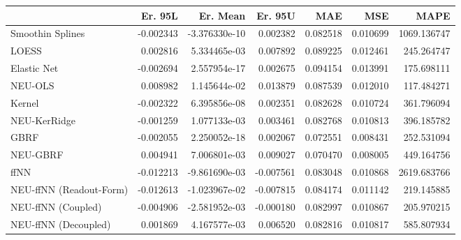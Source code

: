 \begin{tabular}{lrrrrrr}
\toprule
{} &   Er. 95L &      Er. Mean &   Er. 95U &       MAE &       MSE &         MAPE \\
\midrule
Smoothin Splines        & -0.002343 & -3.376330e-10 &  0.002382 &  0.082518 &  0.010699 &  1069.136747 \\
LOESS                   &  0.002816 &  5.334465e-03 &  0.007892 &  0.089225 &  0.012461 &   245.264747 \\
Elastic Net             & -0.002694 &  2.557954e-17 &  0.002675 &  0.094154 &  0.013991 &   175.698111 \\
NEU-OLS                 &  0.008982 &  1.145644e-02 &  0.013879 &  0.087539 &  0.012010 &   117.484271 \\
Kernel                  & -0.002322 &  6.395856e-08 &  0.002351 &  0.082628 &  0.010724 &   361.796094 \\
NEU-KerRidge            & -0.001259 &  1.077133e-03 &  0.003461 &  0.082768 &  0.010813 &   396.185782 \\
GBRF                    & -0.002055 &  2.250052e-18 &  0.002067 &  0.072551 &  0.008431 &   252.531094 \\
NEU-GBRF                &  0.004941 &  7.006801e-03 &  0.009027 &  0.070470 &  0.008005 &   449.164756 \\
ffNN                    & -0.012213 & -9.861690e-03 & -0.007561 &  0.083048 &  0.010868 &  2619.683766 \\
NEU-ffNN (Readout-Form) & -0.012613 & -1.023967e-02 & -0.007815 &  0.084174 &  0.011142 &   219.145885 \\
NEU-ffNN (Coupled)      & -0.004906 & -2.581952e-03 & -0.000180 &  0.082997 &  0.010867 &   205.970215 \\
NEU-ffNN (Decoupled)    &  0.001869 &  4.167577e-03 &  0.006520 &  0.082816 &  0.010817 &   585.807934 \\
\bottomrule
\end{tabular}
